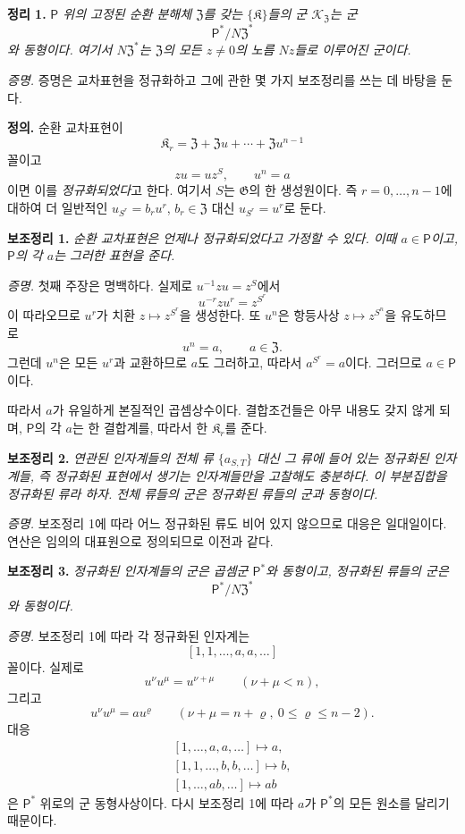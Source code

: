 \noindent\textbf{정리 1.} \emph{\(\mathsf P\) 위의 고정된 순환 분해체 \(\mathfrak Z\)를 갖는 \(\{\mathfrak K\}\)들의 군 \(\mathscr K_{\mathfrak Z}\)는 군}
\[
        \mathsf P^*/N\mathfrak Z^*
\]
\emph{와 동형이다. 여기서 \(N\mathfrak Z^*\)는 \(\mathfrak Z\)의 모든 \(z\ne0\)의 노름 \(Nz\)들로 이루어진 군이다.}

\noindent\emph{증명.} 증명은 교차표현을 정규화하고 그에 관한 몇 가지 보조정리를 쓰는 데 바탕을 둔다.

\noindent\textbf{정의.} 순환 교차표현이
\[
        \mathfrak K_r
        =\mathfrak Z+\mathfrak Zu+
         \cdots+
         \mathfrak Zu^{n-1}
\]
꼴이고
\[
        zu=uz^S,
        \qquad
        u^n=a
\]
이면 이를 \emph{정규화되었다}고 한다. 여기서 \(S\)는 \(\mathfrak G\)의 한 생성원이다. 즉 \(r=0,\ldots,n-1\)에 대하여 더 일반적인 \(u_{S^r}=b_ru^r\), \(b_r\in\mathfrak Z\) 대신 \(u_{S^r}=u^r\)로 둔다.

\noindent\textbf{보조정리 1.} \emph{순환 교차표현은 언제나 정규화되었다고 가정할 수 있다. 이때 \(a\in\mathsf P\)이고, \(\mathsf P\)의 각 \(a\)는 그러한 표현을 준다.}

\noindent\emph{증명.} 첫째 주장은 명백하다. 실제로 \(u^{-1}zu=z^S\)에서
\[
        u^{-r}zu^r=z^{S^r}
\]
이 따라오므로 \(u^r\)가 치환 \(z\mapsto z^{S^r}\)을 생성한다. 또 \(u^n\)은 항등사상 \(z\mapsto z^{S^n}\)을 유도하므로
\[
        u^n=a,
        \qquad
        a\in\mathfrak Z.
\]
그런데 \(u^n\)은 모든 \(u^r\)과 교환하므로 \(a\)도 그러하고, 따라서 \(a^{S^r}=a\)이다. 그러므로 \(a\in\mathsf P\)이다.

따라서 \(a\)가 유일하게 본질적인 곱셈상수이다. 결합조건들은 아무 내용도 갖지 않게 되며, \(\mathsf P\)의 각 \(a\)는 한 결합계를, 따라서 한 \(\mathfrak K_r\)를 준다.

\noindent\textbf{보조정리 2.} \emph{연관된 인자계들의 전체 류 \(\{a_{S,T}\}\) 대신 그 류에 들어 있는 정규화된 인자계들, 즉 정규화된 표현에서 생기는 인자계들만을 고찰해도 충분하다. 이 부분집합을 정규화된 류라 하자. 전체 류들의 군은 정규화된 류들의 군과 동형이다.}

\noindent\emph{증명.} 보조정리 1에 따라 어느 정규화된 류도 비어 있지 않으므로 대응은 일대일이다. 연산은 임의의 대표원으로 정의되므로 이전과 같다.

\noindent\textbf{보조정리 3.} \emph{정규화된 인자계들의 군은 곱셈군 \(\mathsf P^*\)와 동형이고, 정규화된 류들의 군은}
\[
        \mathsf P^*/N\mathfrak Z^*
\]
\emph{와 동형이다.}

\noindent\emph{증명.} 보조정리 1에 따라 각 정규화된 인자계는
\[
        [1,1,\ldots,a,a,\ldots]
\]
꼴이다. 실제로
\[
        u^\nu u^\mu=u^{\nu+\mu}
        \qquad(\nu+\mu<n),
\]
그리고
\[
        u^\nu u^\mu=au^\varrho
        \qquad
        (\nu+\mu=n+\varrho,
         \ 0\leq\varrho\leq n-2).
\]
대응
\[
\begin{gathered}
[1,\ldots,a,a,\ldots]\longmapsto a,\\
[1,1,\ldots,b,b,\ldots]\longmapsto b,\\
[1,\ldots,ab,\ldots]\longmapsto ab
\end{gathered}
\]
은 \(\mathsf P^*\) 위로의 군 동형사상이다. 다시 보조정리 1에 따라 \(a\)가 \(\mathsf P^*\)의 모든 원소를 달리기 때문이다.

